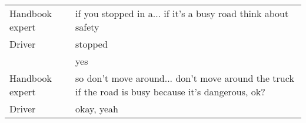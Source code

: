 \begin{table}[H]
\begin{tabular}{p{3cm}p{8cm}}
Handbook expert & if you stopped in a... if it's a busy road think about safety                                                           \\
Driver          & stopped                                                                                                                 \\
                & yes                                                                                                                     \\
Handbook expert & so don't move around... don't move around the truck if the road is busy because it's dangerous, ok?                     \\
Driver          & okay, yeah                                                                                                              \\
\end{tabular}
\end{table}

